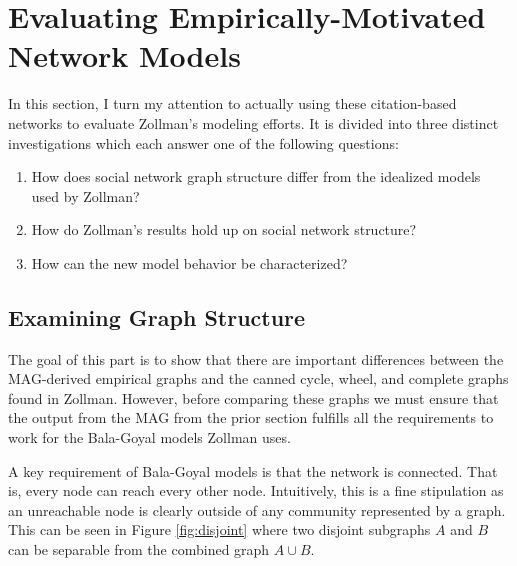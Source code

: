 \hypertarget{evaluating-empirically-motivated-network-models}{%
\chapter{Evaluating Empirically-Motivated Network
Models}\label{evaluating-empirically-motivated-network-models}}

\usetikzlibrary{positioning,arrows,calc}

In this section, I turn my attention to actually using these
citation-based networks to evaluate Zollman's modeling efforts. It is
divided into three distinct investigations which each answer one of the
following questions:

\begin{enumerate}
\def\labelenumi{\arabic{enumi}.}
\tightlist
\item
  How does social network graph structure differ from the idealized
  models used by Zollman?
\item
  How do Zollman's results hold up on social network structure?
\item
  How can the new model behavior be characterized?
\end{enumerate}

\hypertarget{examining-graph-structure}{%
\section{Examining Graph Structure}\label{examining-graph-structure}}

The goal of this part is to show that there are important differences
between the MAG-derived empirical graphs and the canned cycle, wheel,
and complete graphs found in Zollman. However, before comparing these
graphs we must ensure that the output from the MAG from the prior
section fulfills all the requirements to work for the Bala-Goyal models
Zollman uses.

A key requirement of Bala-Goyal models is that the network is connected.
That is, every node can reach every other node. Intuitively, this is a
fine stipulation as an unreachable node is clearly outside of any
community represented by a graph. This can be seen in Figure
\ref{fig:disjoint} where two disjoint subgraphs \(A\) and \(B\) can be
separable from the combined graph \(A \cup B\).

